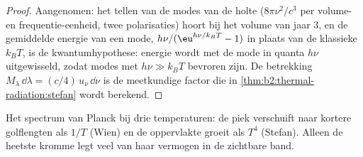 \begin{proof}
Aangenomen: het tellen van de modes van de holte ($8\pi\nu^2/c^3$ per
volume- en frequentie-eenheid, twee polarisaties) hoort bij het volume van jaar 3,
en de gemiddelde energie van een mode, $h\nu/(\eu^{h\nu/k_BT} - 1)$ in plaats van de
klassieke $k_BT$, is de kwantumhypothese: energie wordt met
de mode in quanta $h\nu$ uitgewisseld, zodat modes met $h\nu \gg k_BT$
bevroren zijn. De betrekking $M_\lambda\,\dd\lambda = (c/4)\,u_\nu\,\dd\nu$ is de
meetkundige factor die in \cref{thm:b2:thermal-radiation:stefan} wordt berekend.
\end{proof}

\begin{omfigure}

{\small Het spectrum van Planck bij drie temperaturen: de piek verschuift naar
kortere golflengten als $1/T$ (Wien) en de oppervlakte groeit als $T^4$
(Stefan). Alleen de heetste kromme legt veel van haar vermogen in de zichtbare
band.}
\end{omfigure}

